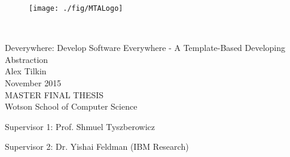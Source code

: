 
\thispagestyle{empty}
\begin{figure}
\centering
\texttt{[image: ./fig/MTALogo]}
\end{figure}

\mbox{}\\[6pc]
\begin{center}
\Huge{Deverywhere: Develop Software Everywhere - A Template-Based Developing Abstraction}\\[2pc]

\Large{Alex Tilkin}\\[1pc]
\large{November 2015}\\[2pc]

MASTER FINAL THESIS\\
Wotson School of Computer Science\\
\end{center}
\vfill

\noindent Supervisor 1: Prof. Shmuel Tyszberowicz

\noindent Supervisor 2: Dr. Yishai Feldman (IBM Research)

